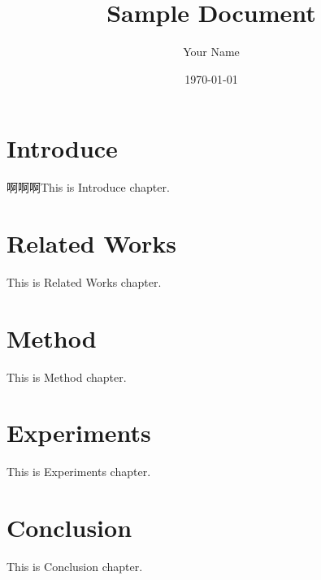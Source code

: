 \documentclass[twocolumn]{article}
\title{Sample Document}
\author{Your Name}
\date{\today}
\begin{document}

\section{Introduce}
啊啊啊This is Introduce chapter.

\section{Related Works}
This is Related Works chapter.

\section{Method}
This is Method chapter.

\section{Experiments}
This is Experiments chapter.

\section{Conclusion}
This is Conclusion chapter.
\end{document}
